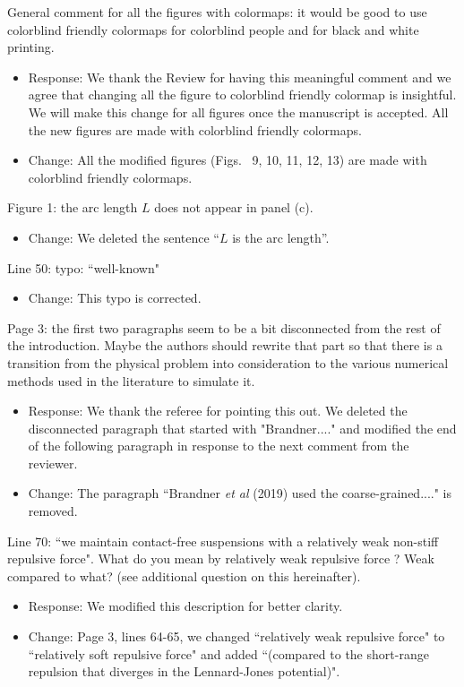 \documentclass[11pt]{article}
\newcommand{\comment}[1]{{\color{blue} #1}}
\begin{document}
\noindent
\comment{General comment for all the figures with colormaps: it would be
good to use colorblind friendly colormaps for colorblind people and for
black and white printing.}
\begin{itemize}
  \item Response: We thank the Review for having this meaningful comment and we agree that changing all the figure 
to colorblind friendly colormap is insightful. We will make this change for all figures once the manuscript is accepted. All the new figures are made with colorblind friendly colormaps.

\item Change: All the modified figures (Figs.~ 9, 10, 11, 12,  13) are made with colorblind friendly colormaps. 
\end{itemize}

\noindent
\comment{Figure 1: the arc length $L$ does not appear in panel (c).}
\begin{itemize}
  \item Change: We deleted the sentence ``$L$ is the arc length''.
\end{itemize}

\noindent
\comment{Line 50: typo: ``well-known"}
\begin{itemize}
  \item Change: This typo is corrected.
\end{itemize}

\noindent
\comment{Page 3: the first two paragraphs seem to be a bit disconnected
from the rest of the introduction. Maybe the authors should rewrite that
part so that there is a transition from the physical problem into
consideration to the various numerical methods used in the literature to
simulate it.}
\begin{itemize}
 \item Response: We thank the referee for pointing this out. We deleted the disconnected paragraph that started with "Brandner...." and modified the end of the following paragraph in response to the next comment from the reviewer.
  \item Change: The paragraph ``Brandner {\it et al} (2019) used the coarse-grained...." is removed.
\end{itemize}

\noindent
\comment{Line 70: ``we maintain contact-free suspensions with a
relatively weak non-stiff repulsive force". What do you mean by
relatively weak repulsive force ? Weak compared to what? (see additional
question on this hereinafter).}
\begin{itemize}
  \item Response: We modified this description for better clarity.
  \item Change: Page 3, lines 64-65, we changed ``relatively weak repulsive force" to ``relatively soft repulsive force" and added ``(compared to the short-range repulsion that diverges in the Lennard-Jones potential)".
  
\end{itemize}
\end{document}
